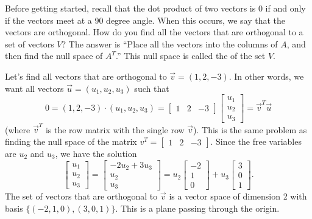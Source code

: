 %
Before getting started, recall that the dot product of two vectors is 0 if and only if the vectors meet at a 90 degree angle. When this occurs, we say that the vectors are orthogonal.
How do you find all the vectors that are orthogonal to a set of vectors $V$? The answer is ``Place all the vectors into the columns of $A$, and then find the null space of $A^T$.'' This null space is called the  of the set $V$. 
%

\begin{example}
Let's find all vectors that are orthogonal to $\vec v = (1,2,-3)$.  In other words, we want all vectors $\vec u = (u_1,u_2,u_3)$ such that 
$$
0=(1,2,-3)\cdot(u_1,u_2,u_3) 
=
\begin{bmatrix}1&2&-3\end{bmatrix}
\begin{bmatrix}u_1\\u_2\\u_3\end{bmatrix}
=\vec v^T \vec u
$$
(where $\vec v^T$ is the row matrix with the single row $\vec v$).  This is the same problem as finding the null space of the matrix $v^T=\begin{bmatrix}1&2&-3\end{bmatrix}$. Since the free variables are $u_2$ and $u_3$, we have the solution 
$$
\begin{bmatrix}
u_1\\u_2\\u_3
\end{bmatrix}
=
\begin{bmatrix}
-2u_2+3u_3\\u_2\\u_3
\end{bmatrix}
=u_2
\begin{bmatrix}
-2\\1\\0
\end{bmatrix}
+u_3\begin{bmatrix}
3\\0\\1
\end{bmatrix}
.$$
The set of vectors that are orthogonal to $\vec v$ is a vector space of dimension 2 with basis $\{(-2,1,0),(3,0,1)\}$. This is a plane passing through the origin.
\end{example}


